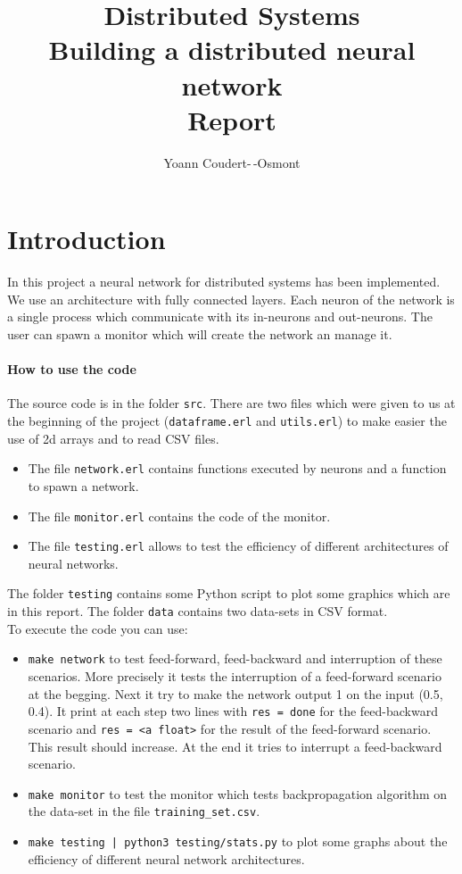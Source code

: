 \documentclass[12pt]{article}
\title{
	Distributed Systems\\
	\textbf{Building a distributed neural network}\\
	Report
}
\author{
	Yoann Coudert-\,-Osmont
}
\begin{document}
	
\maketitle

\section{Introduction}

In this project a neural network for distributed systems has been implemented. We use an architecture with fully connected layers. Each neuron of the network is a single process which communicate with its in-neurons and out-neurons. The user can spawn a monitor which will create the network an manage it.

\paragraph{How to use the code}
The source code is in the folder \verb|src|. There are two files which were given to us at the beginning of the project (\verb|dataframe.erl| and \verb|utils.erl|) to make easier the use of 2d arrays and to read CSV files.
\begin{itemize}
	\item The file \verb|network.erl| contains functions executed by neurons and a function to spawn a network.
	\item The file \verb|monitor.erl| contains the code of the monitor.
	\item The file \verb|testing.erl| allows to test the efficiency of different architectures of neural networks.
\end{itemize}
The folder \verb|testing| contains some Python script to plot some graphics which are in this report. The folder \verb|data| contains two data-sets in CSV format. \\
To execute the code you can use:
\begin{itemize}
	\item \verb|make network| to test feed-forward, feed-backward and interruption of these scenarios. More precisely it tests the interruption of a feed-forward scenario at the begging. Next it try to make the network output 1 on the input (0.5, 0.4). It print at each step two lines with \verb|res = done| for the feed-backward scenario and \verb|res = <a float>| for the result of the feed-forward scenario. This result should increase. At the end it tries to interrupt a feed-backward scenario.
	\item \verb|make monitor| to test the monitor which tests backpropagation algorithm on the data-set in the file \verb|training_set.csv|.
	\item \verb=make testing | python3 testing/stats.py= to plot some graphs about the efficiency of different neural network architectures.
\end{itemize}
\end{document}
